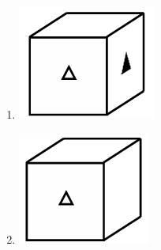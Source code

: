 \documentclass[journal]{IEEEtran}
\theoremstyle{remark}
\begin{document}
\begin{enumerate}[itemsep=1em]
\begin{multicols}{4}
\begin{enumerate}
\begin{minipage}[t]{0.2\textwidth}
        \label{fig:2}
    \end{minipage}
    \item \begin{minipage}[t]{0.2\textwidth}
    \vspace{0pt}
        \includegraphics[width=\columnwidth]{figs/fig-3.jpeg}
        \label{fig:3}
    \end{minipage}
    \item \begin{minipage}[t]{0.2\textwidth}
    \vspace{0pt}
        \includegraphics[width=\columnwidth]{figs/fig-4.jpeg}

\end{minipage}
\end{enumerate}
\end{multicols}
\end{enumerate}
\end{document}
